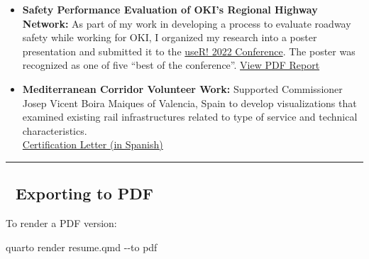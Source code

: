 \documentclass[
  11pt,
]{article}
\newenvironment{Shaded}{\begin{snugshade}}{\end{snugshade}}
\newcommand{\AttributeTok}[1]{\textcolor[rgb]{0.40,0.45,0.13}{#1}}
\newcommand{\ExtensionTok}[1]{\textcolor[rgb]{0.00,0.23,0.31}{#1}}
\newcommand{\NormalTok}[1]{\textcolor[rgb]{0.00,0.23,0.31}{#1}}
\begin{document}
\begin{itemize}
\item
  \textbf{Safety Performance Evaluation of OKI's Regional Highway
  Network:} As part of my work in developing a process to evaluate
  roadway safety while working for OKI, I organized my research into a
  poster presentation and submitted it to the
  \href{https://user2022.r-project.org/program/posters/}{useR! 2022
  Conference}. The poster was recognized as one of five ``best of the
  conference''.
  \href{../assets/pdfs/Roadway\%20Safety\%20Poster\%20V2.pdf}{View PDF
  Report}
\item
  \textbf{Mediterranean Corridor Volunteer Work:} Supported Commissioner
  Josep Vicent Boira Maiques of Valencia, Spain to develop
  visualizations that examined existing rail infrastructures related to
  type of service and technical characteristics.\\
  \href{../assets/pdfs/Carta\%20Peter\%20Fortunato\%20v2.\%201.pdf}{Certification
  Letter (in Spanish)}
\end{itemize}

\begin{center}\rule{0.5\linewidth}{0.5pt}\end{center}

\hypertarget{exporting-to-pdf}{%
\subsection{📄 Exporting to PDF}\label{exporting-to-pdf}}

To render a PDF version:

\begin{Shaded}
\begin{Highlighting}[]
\ExtensionTok{quarto}\NormalTok{ render resume.qmd }\AttributeTok{{-}{-}to}\NormalTok{ pdf}
\end{Highlighting}
\end{Shaded}
\end{document}
